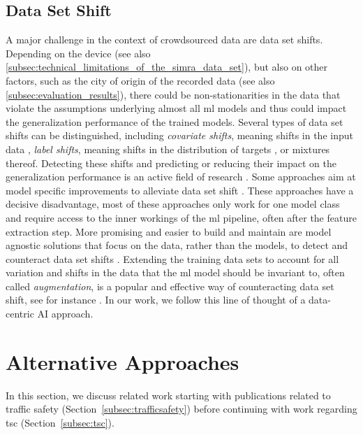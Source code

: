 \subsection{Data Set Shift}
\label{subsec:data_set_shift}
A major challenge in the context of crowdsourced data are data set shifts.
Depending on the device (see also \autoref{subsec:technical_limitations_of_the_simra_data_set}), but also on other factors, such as the city of origin of the recorded data (see also \autoref{subsec:evaluation_results}), there could be non-stationarities in the data that violate the assumptions underlying almost all \ac{ml} models and thus could impact the generalization performance of the trained models.
Several types of data set shifts can be distinguished, including \textit{covariate shifts}, meaning shifts in the input data \cite{sugiyama_machine_2012}, \textit{label shifts}, meaning shifts in the distribution of targets \cite{lipton_detecting_2018}, or mixtures thereof.
Detecting these shifts \cite{polyzotis_data_2018, rabanser_failing_2018, breck_data_2019, abdar_review_2021, bates_testing_2021} and predicting \cite{schelter_learning_2020} or reducing their impact on the generalization performance is an active field of research \cite{schelter_challenges_2018, biessmann_automated_2021}.
Some approaches aim at model specific improvements to alleviate data set shift \cite{sugiyama_machine_2012}. These approaches have a decisive disadvantage, most of these approaches only work for one model class and require access to the inner workings of the \ac{ml} pipeline, often after the feature extraction step.
More promising and easier to build and maintain are model agnostic solutions that focus on the data, rather than the models, to detect and counteract data set shifts \cite{biessmann_automated_2021}.
Extending the training data sets to account for all variation and shifts in the data that the \ac{ml} model should be invariant to, often called \textit{augmentation}, is a popular and effective way of counteracting data set shift, see for instance \cite{cubuk_autoaugment_2019}.
In our work, we follow this line of thought of a data-centric AI approach.


\section{Alternative Approaches}
\label{sec:related_work_cyclesense}
In this section, we discuss related work starting with publications related to traffic safety (Section~\ref{subsec:trafficsafety}) before continuing with work regarding \acl{tsc} (Section~\ref{subsec:tsc}).


